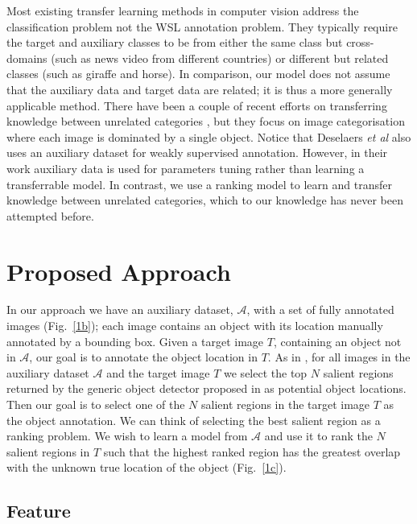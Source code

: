 \documentclass{bmvc2k}
\def\etal{\emph{et al}\bmvaOneDot}
\begin{document}
Most existing transfer learning methods in computer vision address the classification problem not the WSL annotation problem. They typically require the target and auxiliary classes to be from either the same class but cross-domains \cite{Pan_2008,Yangcrossdomain,Sinnotransfercomponent} (such as news video from different countries) or different but related classes \cite{zweig07_iccv} (such as giraffe and horse). In comparison, our model does not assume that the auxiliary data and target data are related; it is thus a more generally applicable method. There have been a couple of recent efforts on transferring knowledge between unrelated categories \cite{Zhengtransfer2011,Rainaselftaought07}, but they focus on image categorisation where each image is dominated by a single object. Notice that Deselaers \etal \cite{Deselaerslocalizing2010} also uses an auxiliary dataset for weakly supervised annotation. However, in their work auxiliary data is used for parameters tuning rather than learning a transferrable model. In contrast, we use a ranking model to learn and transfer knowledge between unrelated categories, which to our knowledge has never been attempted before.


\section{Proposed Approach}
\label{sec:approach}

In our approach we have an auxiliary dataset, $\mathcal{A}$, with a set of fully annotated images (Fig.~\ref{1b}); each image contains an object with its location manually annotated by a bounding box. Given a target image $T$, containing an object not in $\mathcal{A}$, our goal is to annotate the object location in $T$. As in \cite{Deselaerslocalizing2010,Sivaiccv2011}, for all images in the auxiliary dataset $\mathcal{A}$ and the target image $T$ we select the top $N$ salient regions returned by the generic object detector proposed in \cite{Alexewhatisobject} as potential object locations. Then our goal is to select one of the $N$ salient regions in the target image $T$ as the object annotation. We can think of selecting the best salient region as a ranking problem. We wish to learn a model from $\mathcal{A}$ and use it to rank the $N$ salient regions in $T$ such that the highest ranked region has the greatest overlap with the unknown true location of the object (Fig.~\ref{1c}).
 
\subsection{Feature}
\label{sec:Tansfer_Feature}
\end{document}
